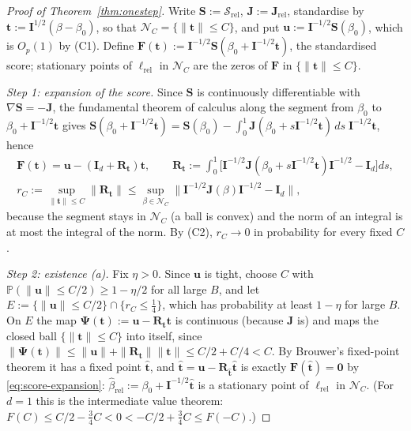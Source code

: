 \documentclass[11pt]{article}
\theoremstyle{definition}
\newcommand{\bS}{\mathbf{S}}
\newcommand{\bI}{\mathbf{I}}
\newcommand{\bzero}{\mathbf{0}}
\newcommand{\Prob}{\mathbb{P}}
\newcommand{\rel}{\mathrm{rel}}
\begin{document}
\begin{proof}[Proof of Theorem~\ref{thm:onestep}]
Write $\bS:=\bm{\mathcal S}_\rel$, $\mathbf J:=\mathbf J_\rel$, standardise by $\bm t:=\mathbf I^{1/2}(\beta-\beta_0)$, so that $\mathcal N_C=\{\|\bm t\|\le C\}$, and put $\bm u:=\mathbf I^{-1/2}\bS(\beta_0)$, which is $O_p(1)$ by (C1). Define $\mathbf F(\bm t):=\mathbf I^{-1/2}\bS(\beta_0+\mathbf I^{-1/2}\bm t)$, the standardised score; stationary points of $\ell_\rel$ in $\mathcal N_C$ are the zeros of $\mathbf F$ in $\{\|\bm t\|\le C\}$.

\emph{Step 1: expansion of the score.} Since $\bS$ is continuously differentiable with $\nabla\bS=-\mathbf J$, the fundamental theorem of calculus along the segment from $\beta_0$ to $\beta_0+\mathbf I^{-1/2}\bm t$ gives $\bS(\beta_0+\mathbf I^{-1/2}\bm t)=\bS(\beta_0)-\int_0^1\mathbf J(\beta_0+s\mathbf I^{-1/2}\bm t)\,ds\;\mathbf I^{-1/2}\bm t$, hence
\begin{equation}\label{eq:score-expansion}
\begin{gathered}
\mathbf F(\bm t)=\bm u-(\bI_d+\mathbf R_{\bm t})\bm t,\qquad\mathbf R_{\bm t}:=\int_0^1\big[\mathbf I^{-1/2}\mathbf J(\beta_0+s\mathbf I^{-1/2}\bm t)\mathbf I^{-1/2}-\bI_d\big]ds,\\
r_C:=\sup_{\|\bm t\|\le C}\|\mathbf R_{\bm t}\|\le\sup_{\beta\in\mathcal N_C}\|\mathbf I^{-1/2}\mathbf J(\beta)\mathbf I^{-1/2}-\bI_d\|,
\end{gathered}
\end{equation}
because the segment stays in $\mathcal N_C$ (a ball is convex) and the norm of an integral is at most the integral of the norm. By (C2), $r_C\to0$ in probability for every fixed $C$.

\emph{Step 2: existence (a).} Fix $\eta>0$. Since $\bm u$ is tight, choose $C$ with $\Prob(\|\bm u\|\le C/2)\ge1-\eta/2$ for all large $B$, and let $E:=\{\|\bm u\|\le C/2\}\cap\{r_C\le\tfrac14\}$, which has probability at least $1-\eta$ for large $B$. On $E$ the map $\bm\Psi(\bm t):=\bm u-\mathbf R_{\bm t}\bm t$ is continuous (because $\mathbf J$ is) and maps the closed ball $\{\|\bm t\|\le C\}$ into itself, since $\|\bm\Psi(\bm t)\|\le\|\bm u\|+\|\mathbf R_{\bm t}\|\|\bm t\|\le C/2+C/4<C$. By Brouwer's fixed-point theorem it has a fixed point $\hat{\bm t}$, and $\hat{\bm t}=\bm u-\mathbf R_{\hat{\bm t}}\hat{\bm t}$ is exactly $\mathbf F(\hat{\bm t})=\bzero$ by \eqref{eq:score-expansion}: $\hat\beta_\rel:=\beta_0+\mathbf I^{-1/2}\hat{\bm t}$ is a stationary point of $\ell_\rel$ in $\mathcal N_C$. (For $d=1$ this is the intermediate value theorem: $F(C)\le C/2-\tfrac34C<0<-C/2+\tfrac34C\le F(-C)$.)


\end{proof}
\end{document}
